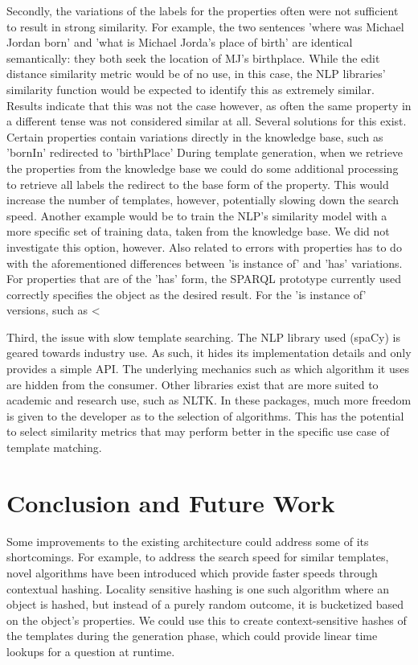 \documentclass[sigplan,screen]{acmart}
\begin{document}
Secondly, the variations of the labels for the properties often were not sufficient to result in strong similarity. For example, the two sentences 'where was Michael Jordan born' and 'what is Michael Jorda's place of birth' are identical semantically: they both seek the location of MJ's birthplace. While the edit distance similarity metric would be of no use, in this case, the NLP libraries' similarity function would be expected to identify this as extremely similar. Results indicate that this was not the case however, as often the same property in a different tense was not considered similar at all. Several solutions for this exist. Certain properties contain variations directly in the knowledge base, such as 'bornIn' redirected to 'birthPlace' During template generation, when we retrieve the properties from the knowledge base we could do some additional processing to retrieve all labels the redirect to the base form of the property. This would increase the number of templates, however, potentially slowing down the search speed. Another example would be to train the NLP's similarity model with a more specific set of training data, taken from the knowledge base. We did not investigate this option, however. Also related to errors with properties has to do with the aforementioned differences between 'is instance of' and 'has' variations. For properties that are of the 'has' form, the SPARQL prototype currently used correctly specifies the object as the desired result. For the 'is instance of' versions, such as <

Third, the issue with slow template searching. The NLP library used (spaCy) is geared towards industry use. As such, it hides its implementation details and only provides a simple API. The underlying mechanics such as which algorithm it uses are hidden from the consumer. Other libraries exist that are more suited to academic and research use, such as NLTK. In these packages, much more freedom is given to the developer as to the selection of algorithms. This has the potential to select similarity metrics that may perform better in the specific use case of template matching.

\section{Conclusion and Future Work}

Some improvements to the existing architecture could address some of its shortcomings. For example, to address the search speed for similar templates, novel algorithms have been introduced which provide faster speeds through contextual hashing. Locality sensitive hashing is one such algorithm where an object is hashed, but instead of a purely random outcome, it is bucketized based on the object's properties. We could use this to create context-sensitive hashes of the templates during the generation phase, which could provide linear time lookups for a question at runtime.
\end{document}
